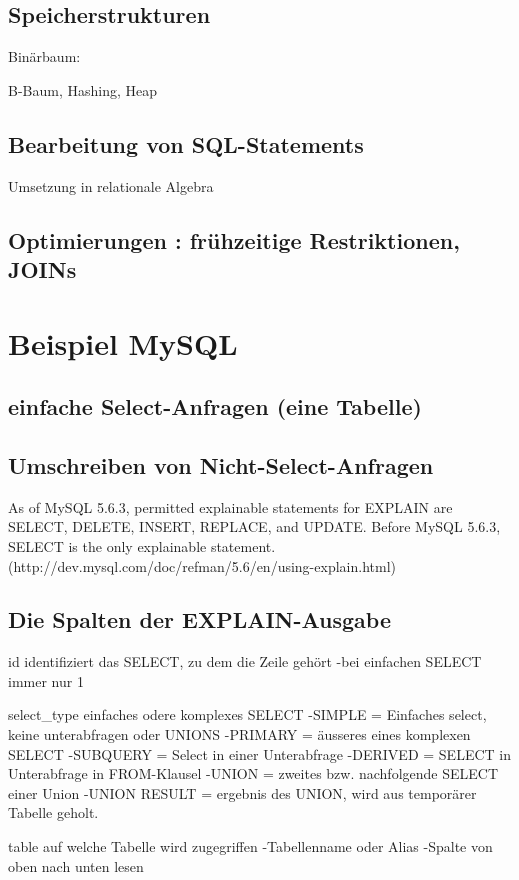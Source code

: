 \subsection{Speicherstrukturen}
 Binärbaum:
 
 B-Baum, Hashing, Heap
 
\subsection{Bearbeitung von SQL-Statements}
 Umsetzung in relationale Algebra
 
\subsection{Optimierungen : frühzeitige Restriktionen, JOINs}


\section{Beispiel MySQL}
\subsection{einfache Select-Anfragen (eine Tabelle)}

\subsection{Umschreiben von Nicht-Select-Anfragen}
As of MySQL 5.6.3, permitted explainable statements for EXPLAIN are SELECT, DELETE, INSERT, REPLACE, and UPDATE. Before MySQL 5.6.3, SELECT is the only explainable statement.
(http://dev.mysql.com/doc/refman/5.6/en/using-explain.html)
\subsection{Die Spalten der EXPLAIN-Ausgabe}
id
identifiziert das SELECT, zu dem die Zeile gehört
-bei einfachen SELECT immer nur 1

select_type
einfaches odere komplexes SELECT
-SIMPLE = Einfaches select, keine unterabfragen oder UNIONS
-PRIMARY = äusseres eines komplexen SELECT
-SUBQUERY = Select in einer Unterabfrage
-DERIVED = SELECT in Unterabfrage in FROM-Klausel
-UNION = zweites bzw. nachfolgende SELECT einer Union
-UNION RESULT = ergebnis des UNION, wird aus temporärer Tabelle geholt.

table
auf welche Tabelle wird zugegriffen
-Tabellenname oder Alias
-Spalte von oben nach unten lesen

